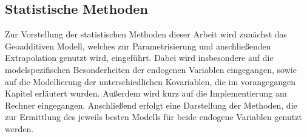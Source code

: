 \documentclass{Vorlage}
\begin{document}
\begin{table}[h]
\centering
\caption{Sozioökonomische und geographische Variablen der Gebäude- und Wohnungszählung im Rahmen des Zensus und deren Anzahl der Ausprägungen.}
\label{Var_Zensus}
\end{table}

\newpage

\subsection{Statistische Methoden}

Zur Vorstellung der statistischen Methoden dieser Arbeit wird zunächst das Geoadditiven Modell, welches zur Parametrisierung und anschließenden Extrapolation genutzt wird, eingeführt. Dabei wird insbesondere auf die modelspezifischen Besonderheiten der endogenen Variablen eingegangen, sowie auf die Modellierung der unterschiedlichen Kovariablen, die im vorangegangen Kapitel erläutert wurden. Außerdem wird kurz auf die Implementierung am Rechner eingegangen. Anschließend erfolgt eine Darstellung der Methoden, die zur Ermittlung des jeweils besten Modells für beide endogene Variablen genutzt werden.
\end{document}
